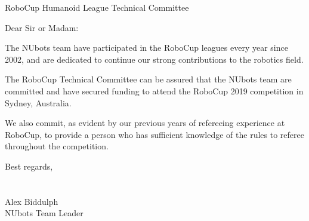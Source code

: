 \documentclass{letter}
\begin{document}
\begin{letter}{RoboCup Humanoid League Technical Committee}
\opening{Dear Sir or Madam:}
The NUbots team have participated in the RoboCup leagues every year since 2002, and are dedicated to continue our strong contributions to the robotics field.

The RoboCup Technical Committee can be assured that the NUbots team are committed and have secured funding to attend the RoboCup 2019 competition in Sydney, Australia.

We also commit, as evident by our previous years of refereeing experience at RoboCup, to provide a person who has sufficient knowledge of the rules to referee throughout the competition.

Best regards, 
~\\
~\\
~\\
Alex Biddulph \\ NUbots Team Leader

\end{letter}
\end{document}
